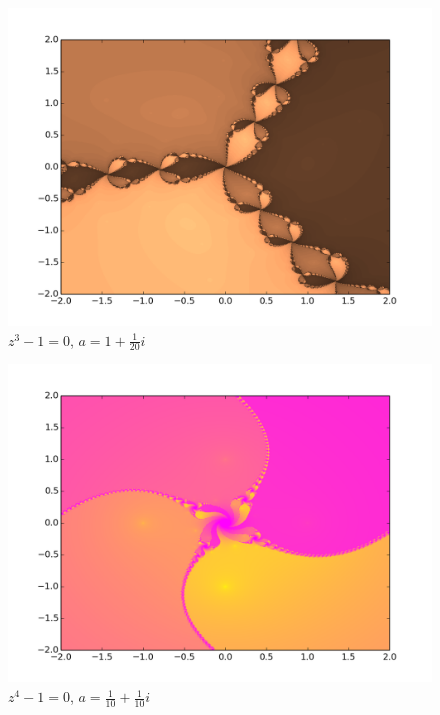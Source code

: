 \documentclass[12pt]{article}
\begin{document}
\begin{figure}[H]
    \centerline{
        \includegraphics[scale=0.63]{fractal_50_1500_3.png}
    }
    \caption*{$z^3 - 1 = 0$, $a = 1 + \frac{1}{20}i$}
\end{figure}
\begin{figure}[H]
    \centerline{
        \includegraphics[scale=0.63]{fractal_350_1500_4.png}
    }
    \caption*{$z^4 - 1 = 0$, $a = \frac{1}{10} + \frac{1}{10}i$}
\end{figure}
\end{document}
